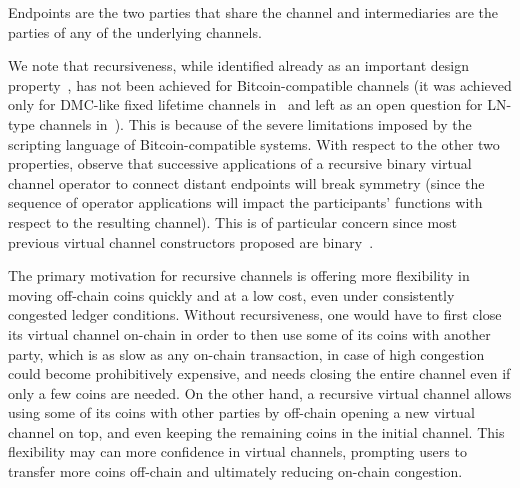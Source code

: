 Endpoints are the two parties that share the channel and intermediaries are
the parties of any of the underlying channels.

We note that recursiveness, while identified already as an important design
property~\cite{DBLP:conf/ccs/DziembowskiFH18}, has not been achieved for Bitcoin-compatible channels
(it was achieved only for DMC-like fixed lifetime channels in~\cite{10.1007/978-3-030-65411-5_18} and left as an open question for LN-type channels in~\cite{9519487}).
This is because of the severe limitations imposed by the scripting language of Bitcoin-compatible systems.
With respect to the other two properties, observe that successive applications
of a recursive binary virtual channel operator to connect distant endpoints will
break symmetry (since the sequence of operator applications will impact the
participants' functions with respect to the resulting channel). This is of
particular concern since most previous virtual channel constructors proposed are
binary~\cite{DBLP:conf/ccs/DziembowskiFH18,9519487,10.1007/978-3-030-65411-5_18}.

The primary motivation for recursive channels is offering more flexibility in
moving off-chain coins quickly and at a low cost, even under consistently
congested ledger conditions. Without recursiveness, one would have to first
close its virtual channel on-chain in order to then use some of its coins with
another party, which is as slow as any on-chain transaction, in case of high
congestion could become prohibitively expensive, and needs closing the entire
channel even if only a few coins are needed. On the other hand, a recursive
virtual channel allows using some of its coins with other parties by off-chain
opening a new virtual channel on top, and even keeping the remaining coins in
the initial channel. This flexibility may can more confidence in virtual
channels, prompting users to transfer more coins off-chain and ultimately
reducing on-chain congestion.

